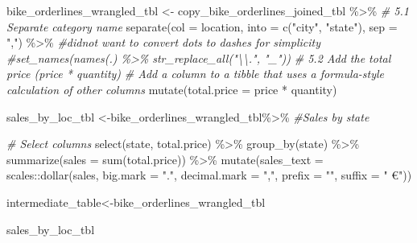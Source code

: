 \documentclass[
]{article}
\newenvironment{Shaded}{\begin{snugshade}}{\end{snugshade}}
\newcommand{\AttributeTok}[1]{\textcolor[rgb]{0.77,0.63,0.00}{#1}}
\newcommand{\CommentTok}[1]{\textcolor[rgb]{0.56,0.35,0.01}{\textit{#1}}}
\newcommand{\FunctionTok}[1]{\textcolor[rgb]{0.00,0.00,0.00}{#1}}
\newcommand{\NormalTok}[1]{#1}
\newcommand{\OtherTok}[1]{\textcolor[rgb]{0.56,0.35,0.01}{#1}}
\newcommand{\SpecialCharTok}[1]{\textcolor[rgb]{0.00,0.00,0.00}{#1}}
\newcommand{\StringTok}[1]{\textcolor[rgb]{0.31,0.60,0.02}{#1}}
\begin{document}
\begin{Shaded}
\begin{Highlighting}[]
\NormalTok{bike\_orderlines\_wrangled\_tbl }\OtherTok{\textless{}{-}}\NormalTok{ copy\_bike\_orderlines\_joined\_tbl }\SpecialCharTok{\%\textgreater{}\%}
  \CommentTok{\# 5.1 Separate category name}
  \FunctionTok{separate}\NormalTok{(}\AttributeTok{col    =}\NormalTok{ location,}
           \AttributeTok{into   =} \FunctionTok{c}\NormalTok{(}\StringTok{"city"}\NormalTok{, }\StringTok{"state"}\NormalTok{),}
           \AttributeTok{sep    =} \StringTok{","}\NormalTok{) }\SpecialCharTok{\%\textgreater{}\%}
\CommentTok{\#didnot want to convert dots to dashes for simplicity}
                    \CommentTok{\#set\_names(names(.) \%\textgreater{}\% str\_replace\_all("\textbackslash{}\textbackslash{}.", "\_"))}
  \CommentTok{\# 5.2 Add the total price (price * quantity) }
  \CommentTok{\# Add a column to a tibble that uses a formula{-}style calculation of other columns}
  \FunctionTok{mutate}\NormalTok{(}\AttributeTok{total.price =}\NormalTok{ price }\SpecialCharTok{*}\NormalTok{ quantity)}



\NormalTok{sales\_by\_loc\_tbl }\OtherTok{\textless{}{-}}\NormalTok{bike\_orderlines\_wrangled\_tbl}\SpecialCharTok{\%\textgreater{}\%}
\CommentTok{\#Sales by state }

  \CommentTok{\# Select columns}
  \FunctionTok{select}\NormalTok{(state, total.price) }\SpecialCharTok{\%\textgreater{}\%} 
  \FunctionTok{group\_by}\NormalTok{(state) }\SpecialCharTok{\%\textgreater{}\%} 
  \FunctionTok{summarize}\NormalTok{(}\AttributeTok{sales =} \FunctionTok{sum}\NormalTok{(total.price)) }\SpecialCharTok{\%\textgreater{}\%}
  \FunctionTok{mutate}\NormalTok{(}\AttributeTok{sales\_text =}\NormalTok{ scales}\SpecialCharTok{::}\FunctionTok{dollar}\NormalTok{(sales, }\AttributeTok{big.mark =} \StringTok{"."}\NormalTok{, }
                                     \AttributeTok{decimal.mark =} \StringTok{","}\NormalTok{, }
                                     \AttributeTok{prefix =} \StringTok{""}\NormalTok{, }
                                     \AttributeTok{suffix =} \StringTok{" €"}\NormalTok{))}

\NormalTok{intermediate\_table}\OtherTok{\textless{}{-}}\NormalTok{bike\_orderlines\_wrangled\_tbl}

\NormalTok{sales\_by\_loc\_tbl}
\end{Highlighting}
\end{Shaded}
\end{document}
